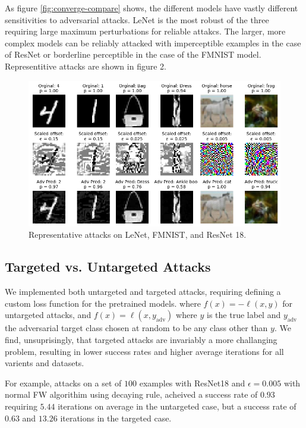 \documentclass{article}
\begin{document}
As figure \ref{fig:converge-compare} shows, the different models have vastly different sensitivities to adversarial attacks. LeNet is the most robust of the three requiring large maximum perturbations for reliable attakcs. The larger, more complex models can be reliably attacked with imperceptible examples in the case of ResNet or borderline perceptible in the case of the FMNIST model. Representitive attacks are shown in figure 2.

\begin{figure}[H]
    \centering
    \includegraphics[width=\textwidth]{plots/adv_ex.png}
    \caption{Representative attacks on LeNet, FMNIST, and ResNet 18.}
    \label{fig:adv_ex}
\end{figure}

\subsection{Targeted vs. Untargeted Attacks}
We implemented both untargeted and targeted attacks, requiring defining a custom loss function for the pretrained models. where $f(x) = -\ell(x, y)$ for untargeted attacks, and $f(x) = \ell(x, y_\text{adv})$ where $y$ is the true label and $y_\text{adv}$ the adversarial target class chosen at random to be any class other than $y$. We find, unsuprisingly, that targeted attacks are invariably a more challanging problem, resulting in lower success rates and higher average iterations for all varients and datasets.

For example, attacks on a set of $100$ examples with ResNet18 and $\epsilon = 0.005$ with normal FW algorithim using decaying rule, acheived a success rate of $0.93$ requiring $5.44$ iterations on average in the untargeted case, but a success rate of $0.63$ and $13.26$ iterations in the targeted case.
\end{document}
